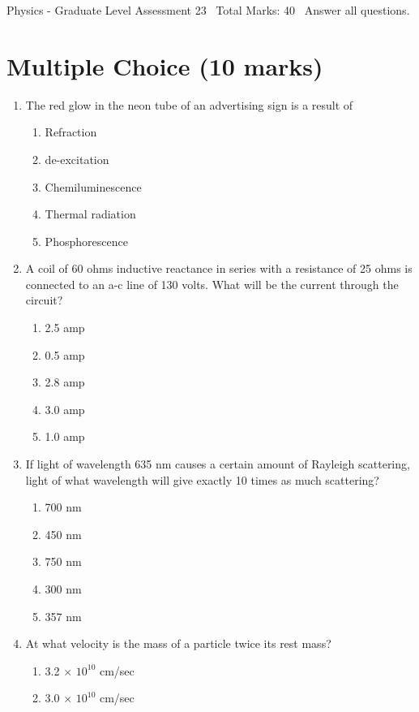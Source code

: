 \documentclass[12pt]{article}
\begin{document}
\begin{center}
Physics - Graduate Level Assessment 23 \
Total Marks: 40 \
Answer all questions.
\end{center}

\section*{Multiple Choice (10 marks)}
\begin{enumerate}[label=\arabic*.]
\item The red glow in the neon tube of an advertising sign is a result of
\begin{enumerate}[label=(\alph*)]
    \item Refraction
    \item de-excitation
    \item Chemiluminescence
    \item Thermal radiation
    \item Phosphorescence
\end{enumerate}
\item A coil of 60 ohms inductive reactance in series with a resistance of 25 ohms is connected to an a-c line of 130 volts. What will be the current through the circuit?
\begin{enumerate}[label=(\alph*)]
    \item 2.5 amp
    \item 0.5 amp
    \item 2.8 amp
    \item 3.0 amp
    \item 1.0 amp
\end{enumerate}
\item If light of wavelength 635 nm causes a certain amount of Rayleigh scattering, light of what wavelength will give exactly 10 times as much scattering?
\begin{enumerate}[label=(\alph*)]
    \item 700 nm
    \item 450 nm
    \item 750 nm
    \item 300 nm
    \item 357 nm
\end{enumerate}
\item At what velocity is the mass of a particle twice its rest mass?
\begin{enumerate}[label=(\alph*)]
    \item 3.2 \ensuremath{\times} $10^10$ cm/sec
    \item 3.0 \ensuremath{\times} $10^10$ cm/sec

\end{enumerate}
\end{enumerate}
\end{document}
